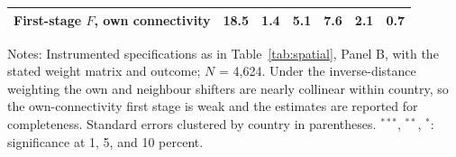 \documentclass[12pt]{article}
\begin{document}
\begin{table}[H]
{\begin{threeparttable}
\begin{tabular}{lcccccc}
  First-stage $F$, own connectivity & 18.5 & 1.4 & 5.1 & 7.6 & 2.1 & 0.7 \\
\bottomrule
\end{tabular}
\begin{tablenotes}[flushleft]
\scriptsize
\item Notes: Instrumented specifications as in Table~\ref{tab:spatial}, Panel B, with the stated weight matrix and outcome; $N$ = 4,624. Under the inverse-distance weighting the own and neighbour shifters are nearly collinear within country, so the own-connectivity first stage is weak and the estimates are reported for completeness. Standard errors clustered by country in parentheses. $^{***}$, $^{**}$, $^{*}$: significance at 1, 5, and 10 percent.
\end{tablenotes}
\end{threeparttable}}
\end{table}
\end{document}
